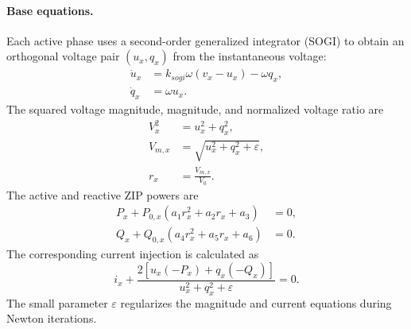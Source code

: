 \paragraph{Base equations.}
Each active phase uses a second-order generalized integrator (SOGI) to obtain an orthogonal voltage pair $(u_x,q_x)$ from the instantaneous voltage:
\begin{align}
    \dot{u}_x &= k_{sogi}\omega\left(v_x-u_x\right)-\omega q_x, \\
    \dot{q}_x &= \omega u_x.
\end{align}
The squared voltage magnitude, magnitude, and normalized voltage ratio are
\begin{align}
    V_x^2 &= u_x^2 + q_x^2, \\
    V_{m,x} &= \sqrt{u_x^2+q_x^2+\varepsilon}, \\
    r_x &= \frac{V_{m,x}}{V_0}.
\end{align}
The active and reactive ZIP powers are
\begin{align}
    P_x + P_{0,x}\left(a_1 r_x^2+a_2 r_x+a_3\right) &= 0, \\
    Q_x + Q_{0,x}\left(a_4 r_x^2+a_5 r_x+a_6\right) &= 0.
\end{align}
The corresponding current injection is calculated as
\begin{equation}
    i_x + \frac{2\left[u_x\left(-P_x\right)+q_x\left(-Q_x\right)\right]}{u_x^2+q_x^2+\varepsilon}=0.
\end{equation}
The small parameter $\varepsilon$ regularizes the magnitude and current equations during Newton iterations.

